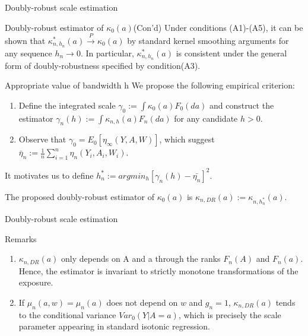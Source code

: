 \documentclass{beamer}
\newcommand{\sn}{\sum_{i=1}^n}
\begin{document}
\begin{frame}{Doubly-robust scale estimation}

\begin{block}{Doubly-robust estimator of $\kappa_0(a)$(Con'd)}
	Under conditions (A1)-(A5), it can be shown that $\kappa^{*}_{n,h_n}(a) \stackrel{P}{\rightarrow} \kappa_0(a)$ by standard kernel smoothing arguments for any sequence $h_n \rightarrow 0$. In particular, $\kappa^{*}_{n,h_n}(a)$ is consistent under the general form of doubly-robustness specified by condition(A3).

\end{block}

\begin{block}{Appropriate value of bandwidth h}
	We propose the following empirical criterion:
	\begin{enumerate}
	\item Define the integrated scale $\gamma_0:=\int\kappa_0(a)F_0(da)$ and construct the estimator $\gamma_n(h):=\int\kappa_{n,h}(a)F_n(da)$ for any candidate $h>0$.
	\item Observe that $\gamma_0=E_0[\eta_{\infty}(Y,A,W)]$, which suggest $\bar{\eta}_n:=\frac{1}{n} \sn \eta_n(Y_i,A_i,W_i)$.
	\end{enumerate}
	It motivates us to define $h^{*}_n:=argmin_h [\gamma_n(h)-\bar{\eta_n}]^2$.
\end{block}

The proposed doubly-robust estimator of $\kappa_0(a)$ is $\kappa_{n,DR}(a):=\kappa_{n,h_n^{*}}(a)$.

\end{frame}


\begin{frame}{Doubly-robust scale estimation}

\begin{block}{Remarks}
	\begin{enumerate}
	\item	$\kappa_{n,DR}(a)$ only depends on A and a through the ranks $F_n(A)$ and $F_n(a)$. Hence, the estimator is invariant to strictly monotone transformations of the exposure.
	\item If $\mu_n(a,w)=\mu_n(a)$ does not depend on $w$ and $g_n=1$, $\kappa_{n,DR}(a)$ tends to the conditional variance $Var_0(Y|A=a)$, which is precisely the scale parameter appearing in standard isotonic regression.
	\end{enumerate}
\end{block}

\end{frame}
\end{document}

